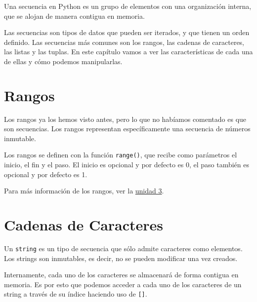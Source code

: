 \documentclass[
  letterpaper,
  DIV=11,
  numbers=noendperiod]{scrreprt}
\begin{document}
Una secuencia en Python es un grupo de elementos con una organización
interna, que se alojan de manera contigua en memoria.

Las secuencias son tipos de datos que pueden ser iterados, y que tienen
un orden definido. Las secuencias más comunes son los rangos, las
cadenas de caracteres, las listas y las tuplas. En este capítulo vamos a
ver las características de cada una de ellas y cómo podemos
manipularlas.

\section{Rangos}\label{rangos}

Los rangos ya los hemos visto antes, pero lo que no habíamos comentado
es que son secuencias. Los rangos representan específicamente una
secuencia de números inmutable.

Los rangos se definen con la función \texttt{range()}, que recibe como
parámetros el inicio, el fin y el paso. El inicio es opcional y por
defecto es 0, el paso también es opcional y por defecto es 1.

\begin{tcolorbox}[enhanced jigsaw, arc=.35mm, toptitle=1mm, colframe=quarto-callout-note-color-frame, bottomtitle=1mm, opacitybacktitle=0.6, colbacktitle=quarto-callout-note-color!10!white, leftrule=.75mm, coltitle=black, toprule=.15mm, titlerule=0mm, title=\textcolor{quarto-callout-note-color}{\faInfo}\hspace{0.5em}{Note}, bottomrule=.15mm, rightrule=.15mm, colback=white, breakable, opacityback=0, left=2mm]

Para más información de los rangos, ver la \hyperref[ciclo-for]{unidad
3}.

\end{tcolorbox}

\section{Cadenas de Caracteres}\label{cadenas-de-caracteres}

Un \texttt{string} es un tipo de secuencia que sólo admite caracteres
como elementos. Los strings son inmutables, es decir, no se pueden
modificar una vez creados.

Internamente, cada uno de los caracteres se almacenará de forma contigua
en memoria. Es por esto que podemos acceder a cada uno de los caracteres
de un string a través de su índice haciendo uso de \texttt{{[}{]}}.
\end{document}
